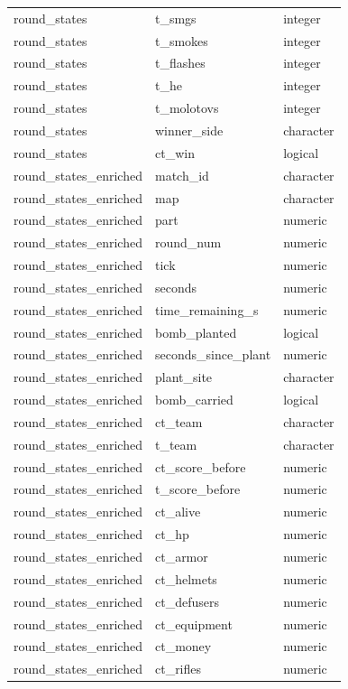 \documentclass[
  letterpaper,
  DIV=11,
  numbers=noendperiod]{scrartcl}
\begin{document}
{\begin{longtable}[]{@{}lll@{}}
round\_states & t\_smgs & integer \\
round\_states & t\_smokes & integer \\
round\_states & t\_flashes & integer \\
round\_states & t\_he & integer \\
round\_states & t\_molotovs & integer \\
round\_states & winner\_side & character \\
round\_states & ct\_win & logical \\
round\_states\_enriched & match\_id & character \\
round\_states\_enriched & map & character \\
round\_states\_enriched & part & numeric \\
round\_states\_enriched & round\_num & numeric \\
round\_states\_enriched & tick & numeric \\
round\_states\_enriched & seconds & numeric \\
round\_states\_enriched & time\_remaining\_s & numeric \\
round\_states\_enriched & bomb\_planted & logical \\
round\_states\_enriched & seconds\_since\_plant & numeric \\
round\_states\_enriched & plant\_site & character \\
round\_states\_enriched & bomb\_carried & logical \\
round\_states\_enriched & ct\_team & character \\
round\_states\_enriched & t\_team & character \\
round\_states\_enriched & ct\_score\_before & numeric \\
round\_states\_enriched & t\_score\_before & numeric \\
round\_states\_enriched & ct\_alive & numeric \\
round\_states\_enriched & ct\_hp & numeric \\
round\_states\_enriched & ct\_armor & numeric \\
round\_states\_enriched & ct\_helmets & numeric \\
round\_states\_enriched & ct\_defusers & numeric \\
round\_states\_enriched & ct\_equipment & numeric \\
round\_states\_enriched & ct\_money & numeric \\
round\_states\_enriched & ct\_rifles & numeric \\

\end{longtable}}
\end{document}
